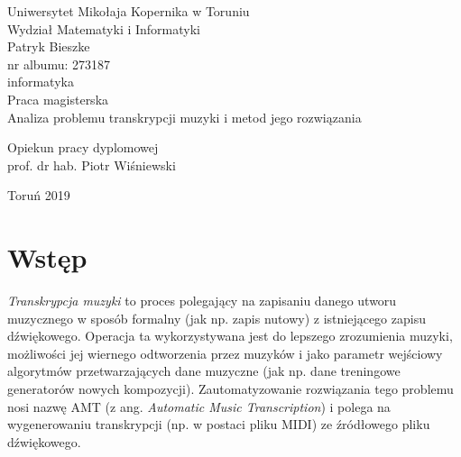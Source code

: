 \documentclass[12pt,a4paper,twoside]{mwart}
\begin{document}
\begin{titlepage}
	\begin{center}
		\large Uniwersytet Mikołaja Kopernika w Toruniu\\
		\large Wydział Matematyki i Informatyki\\
		\vspace{3cm} 
		\large Patryk Bieszke\\
			nr albumu: 273187\\
			informatyka\\
		\vspace{2cm}
		Praca magisterska\\
	
		\vspace{2cm} 
		\huge Analiza problemu transkrypcji muzyki i metod jego rozwiązania\\
	\end{center}
	\hfill
	\begin{minipage}{6cm}
		\vspace{2cm}
		Opiekun pracy dyplomowej\\
		prof. dr hab. Piotr Wiśniewski
	\end{minipage}
	\vspace{3cm}
	\begin{center}
		Toruń 2019\\
	\end{center}
\end{titlepage}



\clearpage
\thispagestyle{empty}
\mbox{}

\tableofcontents 
\clearpage

\setcounter{secnumdepth}{0}
\section{Wstęp}\label{sec:wstep}
\textit{Transkrypcja muzyki} to proces polegający na zapisaniu danego utworu muzycznego w sposób formalny (jak np. zapis nutowy) z istniejącego zapisu dźwiękowego. Operacja ta wykorzystywana jest do lepszego zrozumienia muzyki, możliwości jej wiernego odtworzenia przez muzyków i jako parametr wejściowy algorytmów przetwarzających dane muzyczne (jak np. dane treningowe generatorów nowych kompozycji). Zautomatyzowanie rozwiązania tego problemu nosi nazwę AMT (z ang. \textit{Automatic Music Transcription}) i polega na wygenerowaniu transkrypcji (np. w postaci pliku MIDI) ze źródłowego pliku dźwiękowego.
\end{document}
